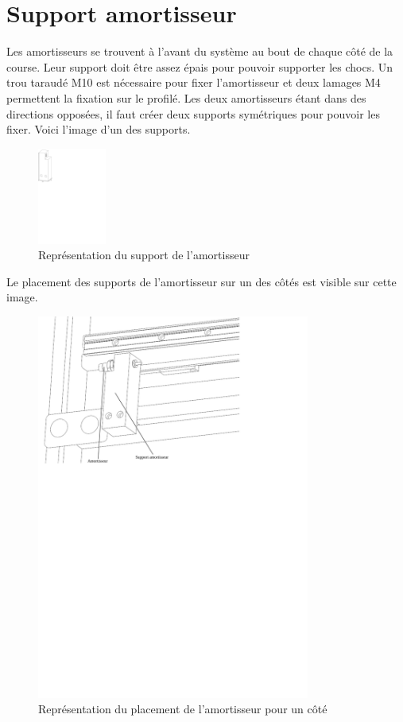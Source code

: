 \section{Support amortisseur}\label{sec:SupAmort}
Les amortisseurs se trouvent à l'avant du système au bout de chaque côté de la course. Leur support doit être assez épais pour pouvoir supporter
les chocs. Un trou taraudé M10 est nécessaire pour fixer l'amortisseur et deux lamages M4 permettent la fixation sur le profilé. Les deux amortisseurs
étant dans des directions opposées, il faut créer deux supports symétriques pour pouvoir les fixer. Voici l'image d'un des supports.

\begin{figure}[H]
  \centering
  \includegraphics[width = 0.2\textwidth]{assets/figures/SupportAmortisseur.svg}
  \caption{Représentation du support de l'amortisseur}
  \label{fig:SupAmort}
\end{figure}

Le placement des supports de l'amortisseur sur un des côtés est visible sur cette image.

\begin{figure}[H]
  \centering
  \includegraphics[width = 0.8\textwidth]{assets/figures/PlacementSupports.svg}
  \caption{Représentation du placement de l'amortisseur pour un côté}
  \label{fig:PlaceSup}
\end{figure}

